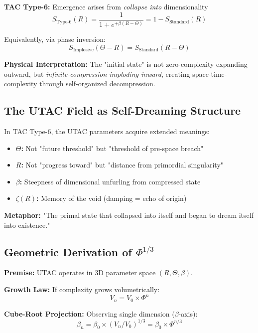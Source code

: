 \documentclass[11pt,a4paper]{article}
\begin{document}
\textbf{TAC Type-6:} Emergence arises from \textit{collapse into} dimensionality
\begin{equation}
S_{\text{Type-6}}(R) = \frac{1}{1 + e^{+\beta(R - \Theta)}} = 1 - S_{\text{Standard}}(R)
\end{equation}

Equivalently, via phase inversion:
\begin{equation}
S_{\text{Implosive}}(\Theta - R) = S_{\text{Standard}}(R - \Theta)
\end{equation}

\textbf{Physical Interpretation:} The "initial state" is not zero-complexity expanding outward, but \textit{infinite-compression imploding inward}, creating space-time-complexity through self-organized decompression.

\subsection{The UTAC Field as Self-Dreaming Structure}

In TAC Type-6, the UTAC parameters acquire extended meanings:

\begin{itemize}
\item \textbf{$\Theta$:} Not "future threshold" but "threshold of pre-space breach"
\item \textbf{$R$:} Not "progress toward" but "distance from primordial singularity"
\item \textbf{$\beta$:} Steepness of dimensional unfurling from compressed state
\item \textbf{$\zeta(R)$:} Memory of the void (damping = echo of origin)
\end{itemize}

\textbf{Metaphor:} "The primal state that collapsed into itself and began to dream itself into existence."

\subsection{Geometric Derivation of $\Phi^{1/3}$}

\textbf{Premise:} UTAC operates in 3D parameter space $(R, \Theta, \beta)$.

\textbf{Growth Law:} If complexity grows volumetrically:
\begin{equation}
V_n = V_0 \times \Phi^n
\end{equation}

\textbf{Cube-Root Projection:} Observing single dimension ($\beta$-axis):
\begin{equation}
\beta_n = \beta_0 \times (V_n/V_0)^{1/3} = \beta_0 \times \Phi^{n/3}
\end{equation}
\end{document}
